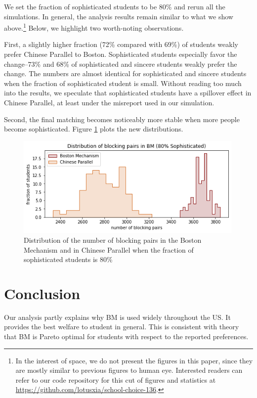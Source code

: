 \documentclass[10pt, reqno]{amsart}
\begin{document}
We set the fraction of sophisticated students to be 80\% and rerun all the simulations. In general, the analysis results remain similar to what we show above.\footnote{In the interest of space, we do not present the figures in this paper, since they are mostly similar to previous figures to human eye. Interested readers can refer to our code repository for this cut of figures and statistics at \url{https://github.com/lotusxia/school-choice-136}.} Below, we highlight two worth-noting observations. 

First, a slightly higher fraction (72\% compared with 69\%) of students weakly prefer Chinese Parallel to Boston. Sophisticated students especially favor the change--73\% and 68\% of sophisticated and sincere students weakly prefer the change. The numbers are almost identical for sophisticated and sincere students when the fraction of sophisticated student is small. Without reading too much into the results, we speculate that sophisticated students have a spillover effect in Chinese Parallel, at least under the misreport used in our simulation. 

Second, the final matching becomes noticeably more stable when more people become sophisticated. Figure \ref{fig:figure5} plots the new distributions. 

\begin{figure}[h]
  \centering
  \includegraphics[width=0.99\textwidth]{../figures/blocking_pairs_hist_p8.png}
  \caption{Distribution of the number of blocking pairs in the Boston Mechanism and in Chinese Parallel when the fraction of sophisticated students is 80\%}
  \label{fig:figure5}
\end{figure}


\section{Conclusion}
\TODO{}
Our analysis partly explains why BM is used widely throughout the US. It provides the best welfare to student in general. This is consistent with theory that BM is Pareto optimal for students with respect to the reported preferences. 
\end{document}
